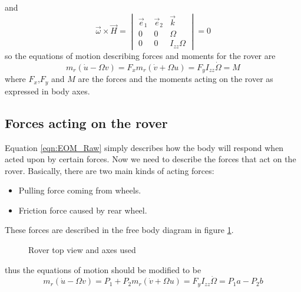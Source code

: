 \documentclass{article}
\begin{document}
	and 
	\[\vec{\omega}\times\vec{H} = \begin{vmatrix}
	\vec{e}_1 &\vec{e}_2&\vec{k}\\0& 0& \Omega\\0& 0& I_{zz}\Omega
	\end{vmatrix} =0 
	\]
	so the equations of motion describing forces and moments for the rover are
	\begin{subequations}
		\begin{equation}
		m_r\left(\dot{u} -\Omega v\right) = F_x
		\end{equation}
		\begin{equation}
		m_r\left(\dot{v} + \Omega u\right) = F_y
		\end{equation}
		\begin{equation}
		I_{zz}\dot{\Omega} = M
		\end{equation}
		\label{eqn:EOM_Raw}
	\end{subequations}
	where $F_x$,$F_y$ and $M$ are the forces and the moments acting on the rover as expressed in body axes.
	\subsection{Forces acting on the rover}
	Equation \ref{eqn:EOM_Raw} simply describes how the body will respond when acted upon by certain forces. Now we need to describe the forces that act on the rover. Basically, there are two main kinds of acting forces:
	\begin{itemize}
		\item Pulling force coming from wheels.
		\item Friction force caused by rear wheel.
	\end{itemize}
	These forces are described in the free body diagram in figure \ref{fig:fbd}.
	\begin{figure}[H]
		\centering
		\def\svgwidth{200pt}
		
		\caption{Rover top view and axes used}
		\label{fig:fbd}
	\end{figure}
	thus the equations of motion should be modified to be
	\begin{subequations}
		\begin{equation}
		m_r\left(\dot{u} -\Omega v\right) = P_1 + P_2
		\end{equation}
		\begin{equation}
		m_r\left(\dot{v} + \Omega u\right) = F_y
		\end{equation}
		\begin{equation}
		I_{zz}\dot{\Omega} = P_1 a - P_2 b
		\end{equation}
		\label{eqn:EOM_mod}
	\end{subequations}
\end{document}
